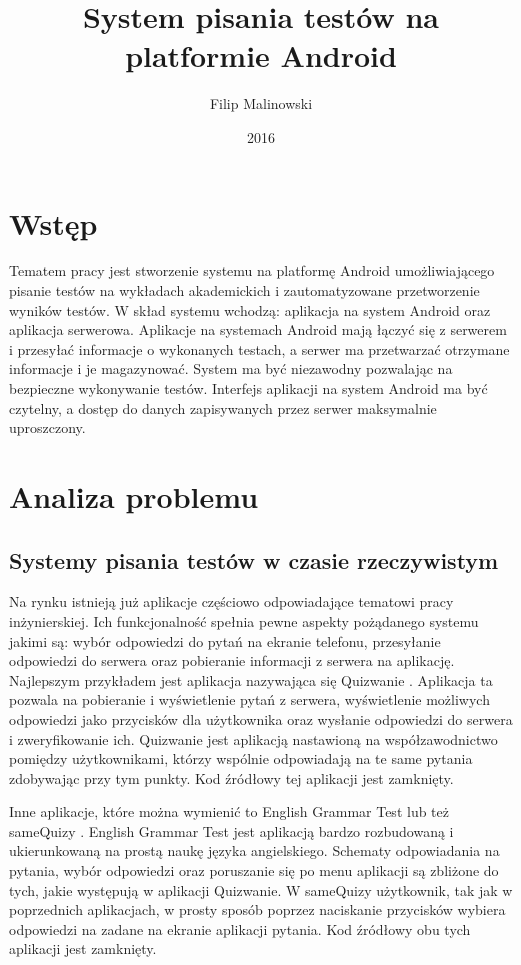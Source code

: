 \documentclass[archivemod, eng]{mgr}
\title{System pisania testów na platformie Android}
\author{Filip Malinowski}
\date{2016}
\begin{document}
\maketitle

\tableofcontents

	\chapter*{Wstęp}
	
	Tematem pracy jest stworzenie systemu na platformę Android umożliwiającego pisanie testów na wykładach akademickich i zautomatyzowane przetworzenie wyników testów. W skład systemu wchodzą: aplikacja na system Android oraz aplikacja serwerowa. Aplikacje na systemach Android mają łączyć się z serwerem i przesyłać informacje o wykonanych testach, a serwer ma przetwarzać otrzymane informacje i je magazynować. System ma być niezawodny pozwalając na bezpieczne wykonywanie testów. Interfejs aplikacji na system Android ma być czytelny, a dostęp do danych zapisywanych przez serwer maksymalnie uproszczony.

	
	\chapter{Analiza problemu}
	
		\section{Systemy pisania testów w czasie rzeczywistym}
		Na rynku istnieją już aplikacje częściowo odpowiadające tematowi pracy inżynierskiej. Ich funkcjonalność spełnia pewne aspekty pożądanego systemu jakimi są: wybór odpowiedzi do pytań na ekranie telefonu, przesyłanie odpowiedzi do serwera oraz pobieranie informacji z serwera na aplikację. Najlepszym przykładem jest aplikacja nazywająca się Quizwanie \cite{quizwanie}. Aplikacja ta pozwala na pobieranie i wyświetlenie pytań z serwera, wyświetlenie możliwych odpowiedzi jako przycisków dla użytkownika oraz wysłanie odpowiedzi do serwera i zweryfikowanie ich. Quizwanie jest aplikacją nastawioną na współzawodnictwo pomiędzy użytkownikami, którzy wspólnie odpowiadają na te same pytania zdobywając przy tym punkty. Kod źródłowy tej aplikacji jest zamknięty.
	
		Inne aplikacje, które można wymienić to English Grammar Test \cite{englishgrammar} lub też sameQuizy \cite{samequizy}. English Grammar Test jest aplikacją bardzo rozbudowaną i ukierunkowaną na prostą naukę języka angielskiego. Schematy odpowiadania na pytania, wybór odpowiedzi oraz poruszanie się po menu aplikacji są zbliżone do tych, jakie występują w aplikacji Quizwanie. W sameQuizy użytkownik, tak jak w poprzednich aplikacjach, w prosty sposób poprzez naciskanie przycisków wybiera odpowiedzi na zadane na ekranie aplikacji pytania. Kod źródłowy obu tych aplikacji jest zamknięty.
		
\end{document}
